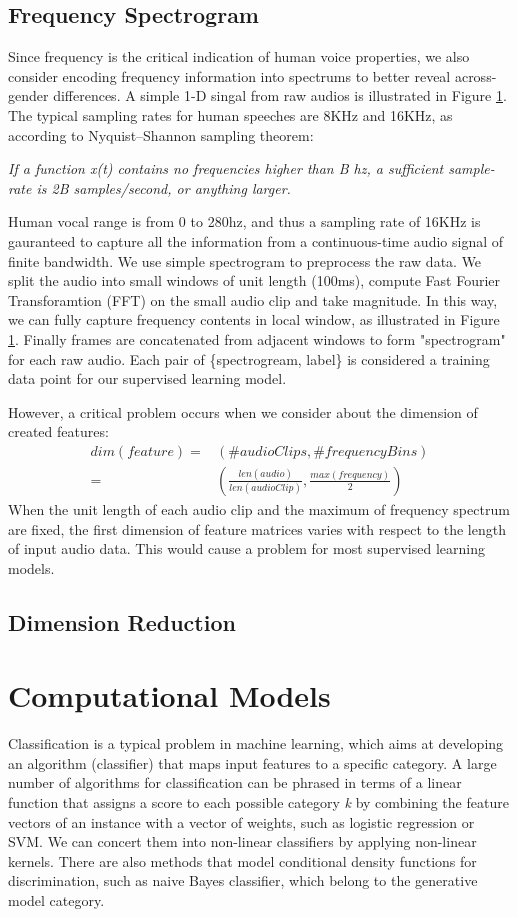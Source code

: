 \documentclass[10pt,letterpaper]{article}
\begin{document}
\subsection{Frequency Spectrogram}
Since frequency is the critical indication of human voice properties, we also consider encoding frequency information into spectrums to better reveal across-gender differences. A simple 1-D singal from raw audios is illustrated in Figure \ref{}. The typical sampling rates for human speeches are 8KHz and 16KHz, as according to Nyquist–Shannon sampling theorem\cite{}:

\textit{If a function x(t) contains no frequencies higher than B hz, a sufficient sample-rate is 2B samples/second, or anything larger.}

Human vocal range is from 0 to 280hz, and thus a sampling rate of 16KHz is gauranteed to capture all the information from a continuous-time audio signal of finite bandwidth.
We use simple spectrogram to preprocess the raw data. We split the audio into small windows of unit length (100ms), compute Fast Fourier Transforamtion (FFT)  on the small audio clip and take magnitude. In this way, we can fully capture  frequency contents in local window, as illustrated in Figure \ref{}. Finally frames are concatenated from adjacent windows to form "spectrogram" for each raw audio. Each pair of \{spectrogream, label\} is considered a training data point for our supervised learning model.

However, a critical problem occurs when we consider about the dimension of created features: 
\begin{align*}
dim(feature) =& (\#audioClips, \#frequencyBins) \\
= &(\frac{len(audio)}{len(audioClip)}, \frac{max(frequency)}{2})
\end{align*}
When the unit length of each audio clip and the maximum of frequency spectrum are fixed, the first dimension of feature matrices varies with respect to the length of input audio data. This would cause a problem for most supervised learning models.

\subsection{Dimension Reduction}

\section{Computational Models}
Classification is a typical problem in machine learning, which aims at developing an algorithm (classifier) that maps input features to a specific category. A large number of algorithms for classification can be phrased in terms of a linear function that assigns a score to each possible category \textit{k} by combining the feature vectors of an instance with a vector of weights, such as logistic regression or SVM. We can concert them into non-linear classifiers by applying non-linear kernels. There are also methods that model conditional density functions for discrimination, such as naive Bayes classifier, which belong to the generative model category.
\end{document}
